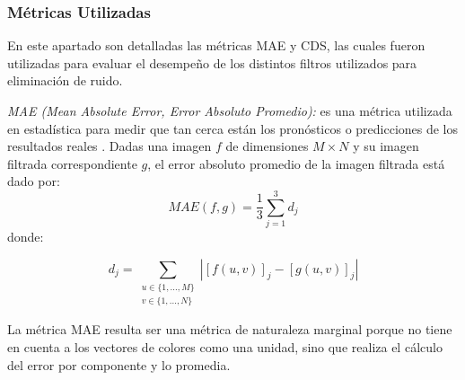 



\subsubsection{M\'etricas Utilizadas}

En este apartado son detalladas las métricas MAE y CDS, las cuales fueron utilizadas para evaluar el desempeño de los distintos filtros utilizados para eliminación de ruido.

\textsl{MAE (Mean Absolute Error, Error Absoluto Promedio):} es una m\'etrica utilizada en estad\'istica para medir que tan cerca est\'an los pron\'osticos o predicciones de los resultados reales \cite{willmott2005advantages}. Dadas una imagen $f$ de dimensiones $M \times N$  y su imagen filtrada correspondiente $g$, el error absoluto promedio de la imagen filtrada est\'a dado por:
\begin{equation}
\label{MAE}
MAE(f,g) = \frac{1}{3}\sum_{j=1}^3 d_j
\end{equation} donde: 


\begin{equation}
d_j = \sum_{\substack{u\in \{1, ..., M\}\\ v \in \{1, ..., N\}}} |[f(u,v)]_{j} - [g(u,v)]_{j}| 
\end{equation}

La m\'etrica MAE resulta ser una m\'etrica de naturaleza marginal porque no tiene en cuenta a los vectores de colores como una unidad, sino que realiza el c\'alculo del error por componente y lo promedia.


